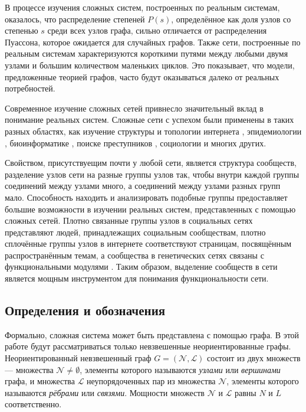 \documentclass{matmex-diploma}
\begin{document}
В процессе изучения сложных систем, построенных по реальным системам, оказалось, что распределение степеней $P(s)$, определённое как доля узлов со степенью $s$ среди всех узлов графа, сильно отличается от распределения Пуассона, которое ожидается для случайных графов. Также сети, построенные по реальным системам характеризуются короткими путями между любыми двумя узлами и большим количеством маленьких циклов\cite{Boccaletti&al:2006}. Это показывает, что модели, предложенные теорией графов, часто будут оказываться далеко от реальных потребностей.

Современное изучение сложных сетей привнесло значительный вклад в понимание реальных систем. Сложные сети с успехом были применены в таких разных областях, как изучение структуры и топологии интернета \cite{Faloutsos&al:1999, Broder&al:2000}, эпидемиологии \cite{Moore&Newman:2000}, биоинформатике \cite{Zhao&al:2006}, поиске преступников \cite{Hong&al:2009}, социологии \cite{Scott:2012} и многих других.

Свойством, присутствуещим почти у любой сети, является структура сообществ, разделение узлов сети на разные группы узлов так, чтобы внутри каждой группы соединений между узлами много, а соединений между узлами разных групп мало. Способность находить и анализировать подобные группы предоставляет большие возможности в изучении реальных систем, представленных с помощью сложных сетей. Плотно связанные группы узлов в социальных сетях представляют людей, принадлежащих социальным сообществам, плотно сплочённые группы узлов в интернете соответствуют страницам, посвящённым распространённым темам, а сообщества в генетических сетях связаны с функциональными модулями \cite{Boccaletti&al:2006}. Таким образом, выделение сообществ в сети является мощным инструментом для понимания функциональности сети.

\subsection{Определения и обозначения}

Формально, сложная система может быть представлена с помощью графа. В этой работе будут рассматриваться только невзвешенные неориентированные графы. Неориентированный невзвешенный граф $G = (\mathscr{N}, \mathscr{L})$ состоит из двух множеств --- множества $\mathscr{N} \ne \emptyset$, элементы которого называются \emph{узлами} или \emph{вершинами} графа, и множества $\mathscr{L}$ неупорядоченных пар из множества $\mathscr{N}$, элементы которого называются \emph{рёбрами} или \emph{связями}. Мощности множеств $\mathscr{N}$ и $\mathscr{L}$ равны $N$ и $L$ соответственно.
\end{document}
